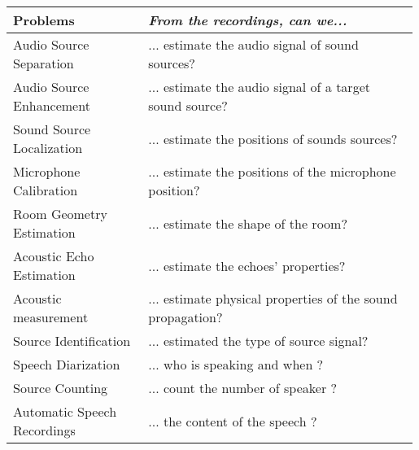 \begin{tabular}{p{0.33\linewidth} p{0.66\linewidth}}
    \toprule
    Problems & \textit{From the recordings, can we...} \\
    \midrule
    Audio Source Separation   & ... estimate the audio signal of sound sources?\\

    Audio Source Enhancement   & ... estimate the audio signal of a target sound source?\\

    Sound Source Localization & ... estimate the positions of sounds sources? \\

    Microphone Calibration    & ... estimate the positions of the microphone position? \\

    Room Geometry Estimation  & ... estimate the shape of the room? \\

    Acoustic Echo Estimation  & ... estimate the echoes' properties? \\

    Acoustic measurement      & ... estimate physical properties of the sound propagation?\\

    \hline
    Source Identification     & ... estimated the type of source signal?\\

    Speech Diarization        & ... who is speaking and when ? \\

    Source Counting           & ... count the number of speaker ? \\

    Automatic Speech Recordings & ... the content of the speech ? \\

    \bottomrule
\end{tabular}